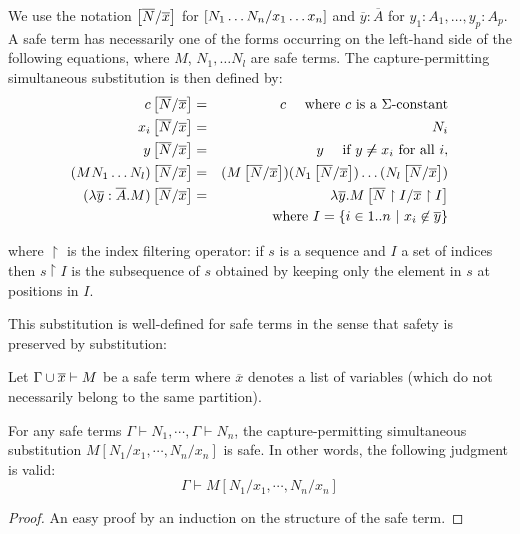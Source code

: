 \begin{dfn}
\label{dnf:safe_simsubst} We use the notation
$\left[ \overline{N}/\overline{x} \right]$ for $\left[ N_1 \ldots N_n/x_1
\ldots x_n \right]$ and $\overline{y}:\overline{A}$ for $y_1:A_1, \ldots,
y_p:A_p$. A safe term has necessarily one of the forms occurring on
the left-hand side of the following equations, where $M$, $N_1,
\ldots N_l$ are safe terms. The capture-permitting simultaneous
substitution is then defined by:
\begin{eqnarray*}
c \left[ \overline{N}/\overline{x} \right] &=& c \quad \mbox{ where $c$ is a $\Sigma$-constant}\\
x_i \left[ \overline{N}/\overline{x} \right] &=& N_i\\
 y \left[ \overline{N}/\overline{x} \right] &=& y \quad \mbox{ if } y \not \neq x_i \mbox{ for all } i,\\
(M N_1 \ldots N_l) \left[ \overline{N}/\overline{x} \right] &=& (M \left[ \overline{N}/\overline{x} \right]) (N_1 \left[ \overline{N}/\overline{x} \right]) \ldots  (N_l \left[ \overline{N}/\overline{x} \right])\\
(\lambda \overline{y} : \overline{A}. M)
\left[ \overline{N}/\overline{x} \right] &=& \lambda \overline{y} . M
\left[ \overline{N} \upharpoonright I/\overline{x} \upharpoonright I \right] \\
&& \mbox{where } I  = \{ i \in 1..n \ | \ x_i \not \in \overline{y} \}
\end{eqnarray*}

where $ \upharpoonright$ is the index filtering operator: if $s$ is
a sequence and $I$ a set of indices then $s \upharpoonright I$ is
the subsequence of $s$ obtained by keeping only the element in $s$
at positions in $I$.
\end{dfn}

This substitution is well-defined for safe terms in the sense that safety is preserved by substitution:

\begin{lem}
\label{lem:subst_preserve_safety} Let $\Gamma \cup \overline{x}
\vdash M$ be a safe term where $\overline{x}$ denotes a list of
variables (which do not necessarily belong to the same partition).

For any safe terms $\Gamma \vdash N_1, \cdots, \Gamma \vdash N_n$,
the capture-permitting simultaneous substitution $M[N_1 / x_1 ,
\cdots, N_n / x_n]$ is safe. In other words, the following judgment
is valid:
$$ \Gamma \vdash M[N_1 / x_1 , \cdots, N_n / x_n] $$
\end{lem}
\begin{proof}
An easy proof by an induction on the structure of the safe term.
\end{proof}



